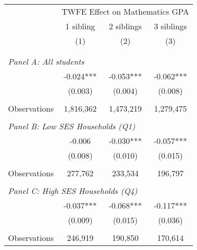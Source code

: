 \makeatletter
{}
{
\makeatother
\begin{tabular}{lccc}
\toprule
\cmidrule(lr){2-4}
& \multicolumn{3}{c}{TWFE Effect on Mathematics GPA} \\
\cmidrule(lr){2-4}
& 1 sibling & 2 siblings & 3 siblings  \\
\cmidrule(lr){2-2} \cmidrule(lr){3-3} \cmidrule(lr){4-4}
& (1) & (2) & (3)\\
\bottomrule
&  &  &  \\
&  &  &   \\
\multicolumn{4}{l}{\textit{Panel A: All students}} \\
\hspace{3mm}        &      -0.024***&      -0.053***&      -0.062***\\
                    &     (0.003)   &     (0.004)   &     (0.008)   \\
                    &               &               &               \\
\hspace{3mm}Observations&   1,816,362   &   1,473,219   &   1,279,475   \\
 
&  &  &   \\
\multicolumn{4}{l}{\textit{Panel B: Low SES Households (Q1)}} \\
\hspace{3mm}        &      -0.006   &      -0.030***&      -0.057***\\
                    &     (0.008)   &     (0.010)   &     (0.015)   \\
                    &               &               &               \\
\hspace{3mm}Observations&     277,762   &     233,534   &     196,797   \\
 
&  &  &   \\
\multicolumn{4}{l}{\textit{Panel C: High SES Households (Q4)}} \\
\hspace{3mm}        &      -0.037***&      -0.068***&      -0.117***\\
                    &     (0.009)   &     (0.015)   &     (0.036)   \\
                    &               &               &               \\
\hspace{3mm}Observations&     246,919   &     190,850   &     170,614   \\
 

\end{tabular}}
